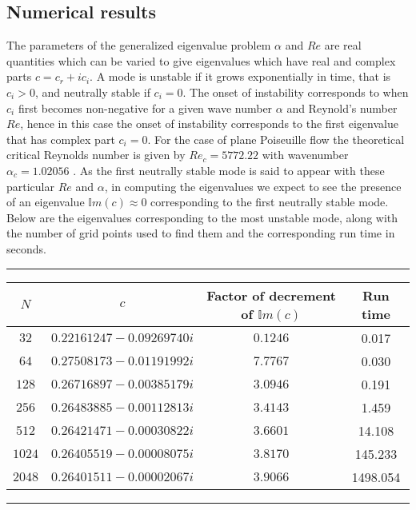 \documentclass[a4paper, 12pt, twoside, openright]{article}
\numberwithin{equation}{section}
\begin{document}
\subsection{Numerical results}
%
%
%
%

The parameters of the generalized eigenvalue problem $\alpha$ and $Re$ are real quantities which can be varied to give eigenvalues which have real and complex parts $c = c_r + ic_i$. A mode is unstable if it grows exponentially in time, that is $c_i>0$, and neutrally stable if $c_i=0$. The onset of instability corresponds to when $c_i$ first becomes non-negative for a given wave number $\alpha$ and Reynold's number $Re$, hence in this case the onset of instability corresponds to the first eigenvalue that has complex part $c_i = 0$. For the case of plane Poiseuille flow the theoretical critical Reynolds number is given by $Re_c = 5772.22$ with wavenumber $\alpha_c = 1.02056$ \citep{Orszag71}. As the first neutrally stable mode is said to appear with these particular $Re$ and $\alpha$, in computing the eigenvalues we expect to see the presence of an eigenvalue $\mathbb{I}m(c)\approx 0$ corresponding to the first neutrally stable mode. Below are the eigenvalues corresponding to the most unstable mode, along with the number of grid points used to find them and the corresponding run time in seconds.%
\begin{table}[H]
\centering
\rule{\linewidth}{1.5pt}
\bgroup
\def\arraystretch{1.25}
\begin{tabular} { c@{\qquad} c@{\qquad} c@{\qquad} c@{\qquad} }
$N$ & $c$ & Factor of decrement of $\mathbb{I}m\left(c\right)$ & Run time \\\hline
$32$ & $0.22161247 - 0.09269740i$ & $0.1246$ & 0.017 \\
$64$ & $0.27508173 - 0.01191992i$ & $7.7767$  & 0.030\\
$128$ & $0.26716897 - 0.00385179i$ & $3.0946$& 0.191   \\
$256$ & $0.26483885 - 0.00112813i$ & $3.4143$ & 1.459\\
$512$ & $0.26421471 - 0.00030822i$ & $3.6601$ & 14.108 \\
$1024$ & $0.26405519 - 0.00008075i$ & $3.8170$ & 145.233\\
$2048$ & $0.26401511 - 0.00002067i$ & $3.9066$ & 1498.054 
\end{tabular}
\egroup
{}
\rule{\linewidth}{1.5pt}
\end{table}
\end{document}
